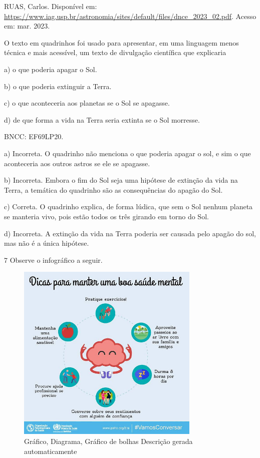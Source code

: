 RUAS, Carlos. Disponível em: 
\url{https://www.iag.usp.br/astronomia/sites/default/files/dnce_2023_02.pdf}.
Acesso em: mar. 2023.

O texto em quadrinhos foi usado para apresentar, em uma linguagem menos
técnica e mais acessível, um texto de divulgação científica que
explicaria

a) o que poderia apagar o Sol.

b) o que poderia extinguir a Terra.

c) o que aconteceria aos planetas se o Sol se apagasse.

d) de que forma a vida na Terra seria extinta se o Sol morresse.

BNCC: EF69LP20.

a) Incorreta. O quadrinho não menciona o que poderia apagar o sol, e sim
o que aconteceria aos outros astros se ele se apagasse.

b) Incorreta. Embora o fim do Sol seja uma hipótese de extinção da vida
na Terra, a temática do quadrinho são as consequências do apagão do Sol.

c) Correta. O quadrinho explica, de forma lúdica, que sem o Sol nenhum
planeta se manteria vivo, pois estão todos os três girando em torno do
Sol.

d) Incorreta. A extinção da vida na Terra poderia ser causada pelo
apagão do sol, mas não é a única hipótese.

\num{7} Observe o infográfico a seguir.

\begin{figure}
\centering
\includegraphics[width=3.43333in,height=3.37681in]{./imgSAEB_6_POR/media/image15.jpeg}
\caption{Gráfico, Diagrama, Gráfico de bolhas Descrição gerada
automaticamente}
\end{figure}

